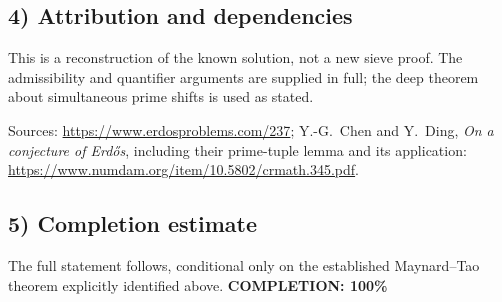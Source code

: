 \subsection{4) Attribution and dependencies}
This is a reconstruction of the known solution, not a new sieve
proof. The admissibility and quantifier arguments are supplied
in full; the deep theorem about simultaneous prime shifts is used
as stated.

Sources: \url{https://www.erdosproblems.com/237};
Y.-G.~Chen and Y.~Ding, \emph{On a conjecture of Erd\H{o}s},
including their prime-tuple lemma and its application:
\url{https://www.numdam.org/item/10.5802/crmath.345.pdf}.

\subsection{5) Completion estimate}
The full statement follows, conditional only on the established
Maynard--Tao theorem explicitly identified above.
\textbf{COMPLETION: 100\%}
